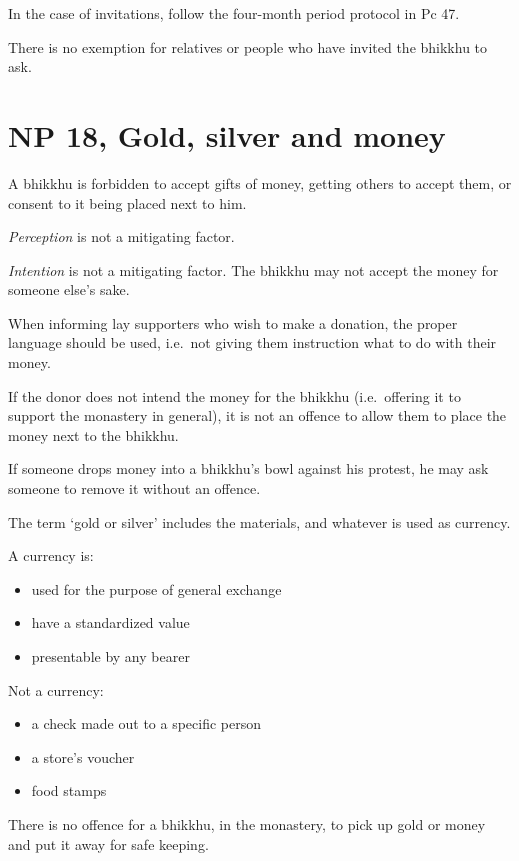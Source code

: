 In the case of invitations, follow the four-month period protocol in Pc
47.

There is no exemption for relatives or people who have invited the
bhikkhu to ask.

\section{NP 18, Gold, silver and money}

A bhikkhu is forbidden to accept gifts of money, getting others to
accept them, or consent to it being placed next to him.

\emph{Perception} is not a mitigating factor.

\emph{Intention} is not a mitigating factor. The bhikkhu may not accept
the money for someone else's sake.

When informing lay supporters who wish to make a donation, the proper
language should be used, i.e.~not giving them instruction what to do
with their money.

If the donor does not intend the money for the bhikkhu (i.e.~offering it
to support the monastery in general), it is not an offence to allow them
to place the money next to the bhikkhu.

If someone drops money into a bhikkhu's bowl against his protest, he may
ask someone to remove it without an offence.

The term `gold or silver' includes the materials, and whatever is used
as currency.

A currency is:

\begin{itemize}
\tightlist
\item
  used for the purpose of general exchange
\item
  have a standardized value
\item
  presentable by any bearer
\end{itemize}

Not a currency:

\begin{itemize}
\tightlist
\item
  a check made out to a specific person
\item
  a store's voucher
\item
  food stamps
\end{itemize}

There is no offence for a bhikkhu, in the monastery, to pick up gold or
money and put it away for safe keeping.

